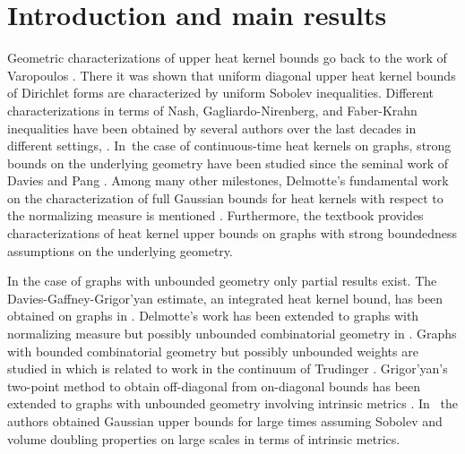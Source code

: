 \documentclass[JEP,XML,SOM,Unicode,published]{cedram}
\theoremstyle{plain}
\theoremstyle{definition}
\begin{document}
\maketitle
\vspace*{-1.5\baselineskip}
\tableofcontents

\section{Introduction and main results}

Geometric characterizations of upper heat kernel bounds go back to the work of Varopoulos \cite{Varopoulos-85}. There it was shown that uniform diagonal upper heat kernel bounds of Dirichlet forms are characterized by uniform Sobolev inequalities. Different characterizations in terms of Nash, Gagliardo-Nirenberg, and Faber-Krahn inequalities have been obtained by several authors over the last decades in different settings, \cite{CarlenKS-87,Coulhon-92,SaloffCoste-92,Grigoryan-94,
SaloffCoste-92a,SaloffC-01,BCS, GrigoryanHH}. In~the case of continuous-time heat kernels on graphs, strong bounds on the underlying geometry have been studied since the seminal work of Davies and Pang \cite{Davies-93,Pang-93}.
Among many other milestones, Delmotte's fundamental work on the characterization of full Gaussian bounds for heat kernels with respect to the normalizing measure is mentioned \cite{Delmotte-99}. Furthermore, the textbook \cite{Barlow-book} provides characterizations of heat kernel upper bounds on graphs with strong boundedness assumptions on the underlying geometry.

In the case of graphs with unbounded geometry only partial results exist. The Davies-Gaffney-Grigor'yan estimate, an integrated heat kernel bound, has been obtained on graphs in \cite{BauerHuaYau-17}. Delmotte's work has been extended to graphs with normalizing measure but possibly unbounded combinatorial geometry in \cite{BarlowChen-16}. Graphs with bounded combinatorial geometry but possibly unbounded weights are studied in \cite{AndresDS-16,Bella-22} which is related to work in the continuum of Trudinger \cite{Trudinger-71}. Grigor'yan's two-point method to obtain off-diagonal from on-diagonal bounds has been extended to graphs with unbounded geometry involving intrinsic metrics \cite{Folz-11}. In~\cite{KellerRose-22b,KellerRose-22a} the authors obtained Gaussian upper bounds for large times assuming Sobolev and volume doubling properties on large scales in terms of intrinsic metrics.
\end{document}

